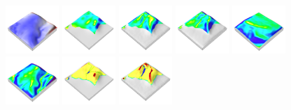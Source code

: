 \documentclass[prodmode,acmtochi]{acmsmall} %
\begin{document}
\begin{figure}[h!]
\begin{center}
		\includegraphics[width=0.18\textwidth]{images/render_3d/mean_dem_difference_5.png}
		\includegraphics[width=0.18\textwidth]{images/render_3d/mean_slope_1.png}
		\includegraphics[width=0.18\textwidth]{images/render_3d/mean_slope_2.png}
		\includegraphics[width=0.18\textwidth]{images/render_3d/mean_slope_3.png}
		\includegraphics[width=0.18\textwidth]{images/render_3d/mean_slope_4.png}
		\includegraphics[width=0.18\textwidth]{images/render_3d/mean_slope_5.png}
		\includegraphics[width=0.18\textwidth]{images/render_3d/mean_forms_1.png}
		\includegraphics[width=0.18\textwidth]{images/render_3d/mean_forms_2.png}

\end{center}
\end{figure}
\end{document}

